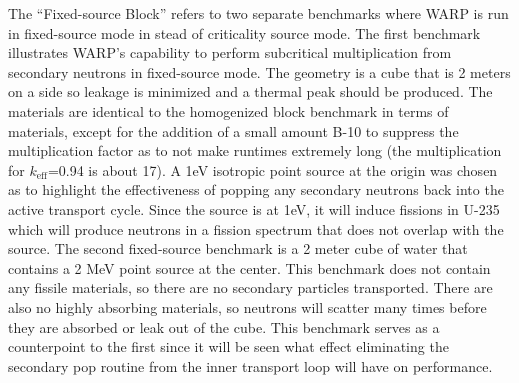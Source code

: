 The ``Fixed-source Block'' refers to two separate benchmarks where WARP is run in fixed-source mode in stead of criticality source mode. The first benchmark illustrates WARP's capability to perform subcritical multiplication from secondary neutrons in fixed-source mode.  The geometry is a cube that is 2 meters on a side so leakage is minimized and a thermal peak should be produced.  The materials are identical to the homogenized block benchmark in terms of materials, except for the addition of a small amount B-10 to suppress the multiplication factor as to not make runtimes extremely long (the multiplication for $k_\mathrm{eff}$=0.94 is about 17).   A 1eV isotropic point source at the origin was chosen as to highlight the effectiveness of popping any secondary neutrons back into the active transport cycle.  Since the source is at 1eV, it will induce fissions in U-235 which will produce neutrons in a fission spectrum that does not overlap with the source.  The second fixed-source benchmark is a 2 meter cube of water that contains a 2 MeV point source at the center.  This benchmark does not contain any fissile materials, so there are no secondary particles transported. There are also no highly absorbing materials, so neutrons will scatter many times before they are absorbed or leak out of the cube.  This benchmark serves as a counterpoint to the first since it will be seen what effect eliminating the secondary pop routine from the inner transport loop will have on performance.


